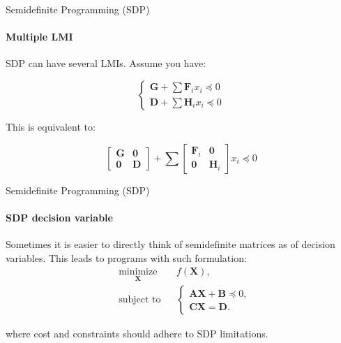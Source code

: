 \documentclass{beamer}
\begin{document}
\begin{frame}{Semidefinite Programming (SDP)}
\framesubtitle{Multiple LMI}
\begin{flushleft}

SDP can have several LMIs. Assume you have:

\begin{equation}
    \begin{cases}
        \mathbf{G} + \sum \mathbf{F}_i x_i \preceq 0 \\
        \mathbf{D} + \sum \mathbf{H}_i x_i \preceq 0
    \end{cases}
\end{equation}


This is equivalent to:

\begin{equation}
    \begin{bmatrix} 
            \mathbf{G} & \mathbf{0} \\
            \mathbf{0} & \mathbf{D}
    \end{bmatrix} +
    \sum
    \begin{bmatrix} 
            \mathbf{F}_i & \mathbf{0} \\
            \mathbf{0}   & \mathbf{H}_i
    \end{bmatrix}
    x_i \preceq 0
\end{equation}

\end{flushleft}
\end{frame}




\begin{frame}{Semidefinite Programming (SDP)}
\framesubtitle{SDP decision variable}
\begin{flushleft}

Sometimes it is easier to directly think of semidefinite matrices as of decision variables. This leads to programs with such formulation:
%
\begin{equation}
\begin{aligned}
& \underset{\mathbf{X}}{\text{minimize}}
& & f(\mathbf{X}), \\
& \text{subject to}
& & \begin{cases}
     \mathbf{A}\mathbf{X} +  \mathbf{B} \preceq 0, \\
     \mathbf{C}\mathbf{X} = \mathbf{D}.
    \end{cases}
\end{aligned}
\end{equation}

where cost and constraints should adhere to SDP limitations.

\end{flushleft}
\end{frame}
\end{document}
